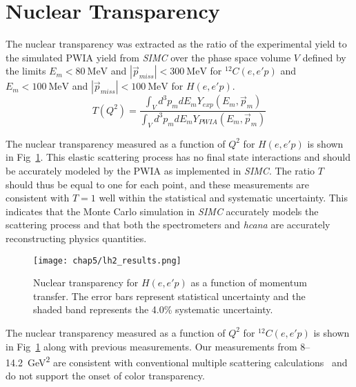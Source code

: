 \section{Nuclear Transparency}

The nuclear transparency was extracted as the ratio of the experimental yield
to the simulated PWIA yield from \textit{SIMC} over the phase space volume $V$
defined by the limits
$E_m<\SI{80}{\mega\electronvolt}$ and
$|\vec{p}_{miss}|<\SI{300}{\mega\electronvolt}$ for ${}^{12}C(e,e'p)$
and
$E_m<\SI{100}{\mega\electronvolt}$ and
$|\vec{p}_{miss}|<\SI{100}{\mega\electronvolt}$ for $H(e,e'p)$.
\begin{equation}
    T(Q^2) = \frac{\int_{V} d^{3} p_{m} d E_{m} Y_{exp }(E_{m}, \vec{p}_{m})}
                  {\int_{V} d^{3} p_{m} d E_{m} Y_{PWIA}(E_{m}, \vec{p}_{m})}
\end{equation}

The nuclear transparency measured as a function of $Q^2$ for $H(e,e'p)$ is
shown in Fig~\ref{fig:lh2_transparency_results}.
This elastic scattering process has no final state interactions and should be
accurately modeled by the PWIA as implemented in \textit{SIMC}.
The ratio $T$ should thus be equal to one for each point, and these
measurements are consistent with $T=1$ well within the statistical and
systematic uncertainty.
This indicates that the Monte Carlo simulation in \textit{SIMC} accurately
models the scattering process and that both the spectrometers and
\textit{hcana} are accurately reconstructing physics quantities.

\begin{figure}[!h]
    \centering
    \texttt{[image: chap5/lh2\_results.png]}
    \caption[Nuclear transparency for $H(e,e'p)$ as a function of
            momentum transfer.]{
            Nuclear transparency for $H(e,e'p)$ as a function of
            momentum transfer.
            The error bars represent statistical uncertainty and the
            shaded band represents the 4.0\% systematic uncertainty.
            }
    \label{fig:lh2_transparency_results}
\end{figure}

The nuclear transparency measured as a function of $Q^2$ for ${}^{12}C(e,e'p)$
is shown in Fig~\ref{fig:lh2_transparency_results} along with previous
measurements.
Our measurements from 8--\SI{14.2}{\giga\electronvolt\squared} are consistent
with conventional multiple scattering calculations~\cite{Pandharipande_1992}
and do not support the onset of color transparency.

